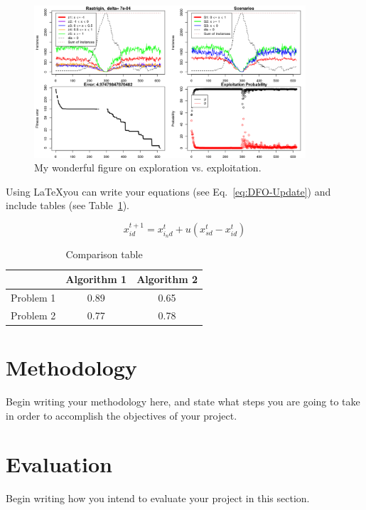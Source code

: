 \documentclass{article} %
\begin{document}
\begin{figure}[ht]
	\centering
	\includegraphics[width=0.9\textwidth]{images/sample.png}
	\caption{My wonderful figure on exploration vs. exploitation. \label{fig:wonderful}}
\end{figure}

Using \LaTeX you can write your equations (see Eq.~\ref{eq:DFO-Update}) and include tables (see Table~\ref{table:Comparison}).

\begin{equation}
	x^{t+1}_{id} = x^t_{i_nd} + u (x_{sd}^t - x_{id}^t) \label{eq:DFO-Update}
\end{equation}

\begin{table}[h]
	\caption{Comparison table} \label{table:Comparison}
	\centering
	\begin{tabular}{lcc}
		\hline
		 & Algorithm 1 & Algorithm 2 \\
		\hline
		\hline
		Problem 1 & 0.89 & 0.65 \\
		Problem 2 & 0.77 & 0.78 \\
		\hline 
	\end{tabular}
\end{table}

\section{Methodology}
Begin writing your methodology here, and state what steps you are going to take in order to accomplish the objectives of your project.

\section{Evaluation}
Begin writing how you intend to evaluate your project in this section.



\end{document}
